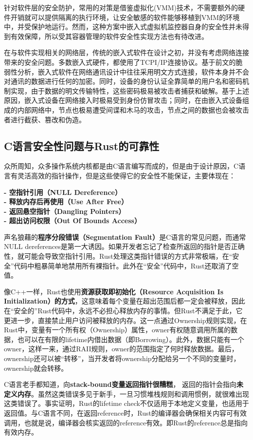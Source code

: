 \documentclass[12pt, a4paper]{article}
\begin{document}
	针对软件层的安全防护，常用的对策是借鉴虚拟化(VMM)技术，不需要额外的硬件开销就可以提供隔离的执行环境，让安全敏感的软件能够移植到VMM的环境中，并受保护地运行。然而，这种方案中嵌入式虚拟机监控器自身的安全性并未得到有效保障，所以受其容器管理的软件安全性实现方法也有待改进。
	
	在与软件实现相关的网络层，传统的嵌入式软件在设计之初，并没有考虑网络连接带来的安全问题。多数嵌入式硬件，都使用了TCPI/IP连接协议。基于前文的脆弱性分析，嵌入式软件在网络通讯设计中往往采用明文方式连接，软件本身并不会对通讯的数据进行任何的加密。同时，设备的身份认证全靠简单的用户名和密码机制实现，由于数据的明文传输特性，这些密码极易被攻击者捕获和破解。基于上述原因，嵌入式设备在网络接入时极易受到身份仿冒攻击；同时，在由嵌入式设备组成的内部网络中，节点也极易遭受间谍和木马的攻击，节点之间的数据也会被攻击者进行截获、篡改和伪造。
	\subsection{C语言安全性问题与Rust的可靠性}
	众所周知，众多操作系统内核都是由C语言编写而成的，但是由于设计原因，C语言有灵活高效的指针操作，但是这些使得它的安全性不能保证，主要体现在：
	
\textbf{- 空指针引用（NULL Dereference）\\
		- 释放内存后再使用（Use After Free）\\
		- 返回悬空指针（Dangling Pointers）\\
		- 超出访问权限（Out Of Bounds Access）}
	
	声名狼藉的\textbf{程序分段错误（Segmentation Fault）}是C语言的常见问题，而通常NULL dereferences是第一大诱因。如果开发者忘记了检查所返回的指针是否正确性，就可能会导致空指针引用。Rust处理这类指针错误的方式非常极端，在“安全”代码中粗暴简单地禁用所有裸指针。此外在“安全”代码中，Rust还取消了空值。
	
	像C++一样，Rust也使用\textbf{资源获取即初始化（Resource Acquisition Is Initialization）的方式}，这意味着每个变量在超出范围后都一定会被释放，因此在“安全的”Rust代码中，永远不必担心释放内存的事情。但Rust不满足于此，它更进一步，直接禁止用户访问被释放的内存。这一点通过Ownership规则实现，在Rust中，变量有一个所有权（Ownership）属性，owner有权随意调用所属的数据，也可以在有限的lifetime内借出数据（即Borrowing）。此外，数据只能有一个owner，这样一来，通过RAII规则，owner的范围指定了何时释放数据。最后，ownership还可以被“转移”，当开发者将ownership分配给另一个不同的变量时，ownership就会转移。
	
	C语言老手都知道，向\textbf{stack-bound变量返回指针很糟糕}， 返回的指针会指向\textbf{未定义内存}。虽然这类错误多见于新手，一旦习惯堆栈规则和调用惯例，就很难出现这类错误了。事实证明，Rust的lifetime check不仅适用于本地定义变量，也适用于返回值。与C语言不同，在返回reference时，Rust的编译器会确保相关内容可有效调用，也就是说，编译器会核实返回的reference有效。即Rust的reference总是指向有效内存。
	
\end{document}
